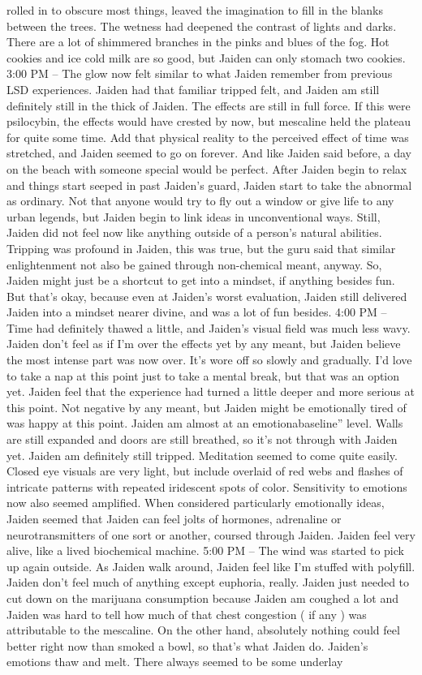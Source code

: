\documentclass[12pt]{book}
\begin{document}
rolled in to obscure most things, leaved the imagination to fill in the blanks between the trees. The wetness had deepened the contrast of lights and darks. There are a lot of shimmered branches in the pinks and blues of the fog. Hot cookies and ice cold milk are so good, but Jaiden can only stomach two cookies. 3:00 PM -- The glow now felt similar to what Jaiden remember from previous LSD experiences. Jaiden had that familiar tripped felt, and Jaiden am still definitely still in the thick of Jaiden. The effects are still in full force. If this were psilocybin, the effects would have crested by now, but mescaline held the plateau for quite some time. Add that physical reality to the perceived effect of time was stretched, and Jaiden seemed to go on forever. And like Jaiden said before, a day on the beach with someone special would be perfect. After Jaiden begin to relax and things start seeped in past Jaiden's guard, Jaiden start to take the abnormal as ordinary. Not that anyone would try to fly out a window or give life to any urban legends, but Jaiden begin to link ideas in unconventional ways. Still, Jaiden did not feel now like anything outside of a person's natural abilities. Tripping was profound in Jaiden, this was true, but the guru said that similar enlightenment not also be gained through non-chemical meant, anyway. So, Jaiden might just be a shortcut to get into a mindset, if anything besides fun. But that's okay, because even at Jaiden's worst evaluation, Jaiden still delivered Jaiden into a mindset nearer divine, and was a lot of fun besides. 4:00 PM -- Time had definitely thawed a little, and Jaiden's visual field was much less wavy. Jaiden don't feel as if I'm over the effects yet by any meant, but Jaiden believe the most intense part was now over. It's wore off so slowly and gradually. I'd love to take a nap at this point just to take a mental break, but that was an option yet. Jaiden feel that the experience had turned a little deeper and more serious at this point. Not negative by any meant, but Jaiden might be emotionally tired of was happy at this point. Jaiden am almost at an emotionabaseline'' level. Walls are still expanded and doors are still breathed, so it's not through with Jaiden yet. Jaiden am definitely still tripped. Meditation seemed to come quite easily. Closed eye visuals are very light, but include overlaid of red webs and flashes of intricate patterns with repeated iridescent spots of color. Sensitivity to emotions now also seemed amplified. When considered particularly emotionally ideas, Jaiden seemed that Jaiden can feel jolts of hormones, adrenaline or neurotransmitters of one sort or another, coursed through Jaiden. Jaiden feel very alive, like a lived biochemical machine. 5:00 PM -- The wind was started to pick up again outside. As Jaiden walk around, Jaiden feel like I'm stuffed with polyfill. Jaiden don't feel much of anything except euphoria, really. Jaiden just needed to cut down on the marijuana consumption because Jaiden am coughed a lot and Jaiden was hard to tell how much of that chest congestion ( if any ) was attributable to the mescaline. On the other hand, absolutely nothing could feel better right now than smoked a bowl, so that's what Jaiden do. Jaiden's emotions thaw and melt. There always seemed to be some underlay 
\end{document}
